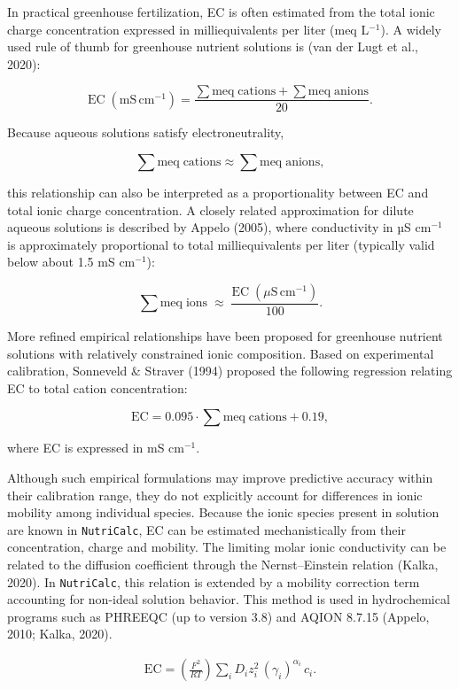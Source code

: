 \documentclass[
  letterpaper,
  DIV=11,
  numbers=noendperiod]{scrreprt}
\begin{document}
In practical greenhouse fertilization, EC is often estimated from the
total ionic charge concentration expressed in milliequivalents per liter
(meq L\(^{-1}\)). A widely used rule of thumb for greenhouse nutrient
solutions is (van der Lugt et al., 2020):

\[
\mathrm{EC}\;(\mathrm{mS\,cm^{-1}})
=
\frac{
\sum \mathrm{meq\;cations}
+
\sum \mathrm{meq\;anions}
}{20}.
\]

Because aqueous solutions satisfy electroneutrality,

\[
\sum \mathrm{meq\;cations}
\approx
\sum \mathrm{meq\;anions},
\]

this relationship can also be interpreted as a proportionality between
EC and total ionic charge concentration. A closely related approximation
for dilute aqueous solutions is described by Appelo (2005), where
conductivity in µS cm\(^{-1}\) is approximately proportional to total
milliequivalents per liter (typically valid below about 1.5 mS
cm\(^{-1}\)):

\[
\sum \mathrm{meq\;ions}
\;\approx\;
\frac{\mathrm{EC}\;(\mu\mathrm{S\,cm^{-1}})}{100}.
\]

More refined empirical relationships have been proposed for greenhouse
nutrient solutions with relatively constrained ionic composition. Based
on experimental calibration, Sonneveld \& Straver (1994) proposed the
following regression relating EC to total cation concentration:

\[
\mathrm{EC}
=
0.095
\cdot
\sum \mathrm{meq\;cations}
+
0.19,
\]

where EC is expressed in mS cm\(^{-1}\).

Although such empirical formulations may improve predictive accuracy
within their calibration range, they do not explicitly account for
differences in ionic mobility among individual species. Because the
ionic species present in solution are known in \texttt{NutriCalc}, EC
can be estimated mechanistically from their concentration, charge and
mobility. The limiting molar ionic conductivity can be related to the
diffusion coefficient through the Nernst--Einstein relation (Kalka,
2020). In \texttt{NutriCalc}, this relation is extended by a mobility
correction term accounting for non-ideal solution behavior. This method
is used in hydrochemical programs such as PHREEQC (up to version 3.8)
and AQION 8.7.15 (Appelo, 2010; Kalka, 2020).

\begin{align}
\label{eq:ec}
\mathrm{EC}
=
\left(\frac{F^2}{R T}\right)
\sum_{i} D_i z_i^{2}\, (\gamma_i)^{\alpha_i}\, c_i.
\tag{6}
\end{align}
\end{document}
